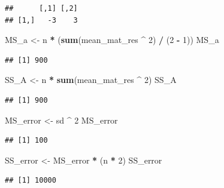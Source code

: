 \documentclass[]{book}
\newenvironment{Shaded}{\begin{snugshade}}{\end{snugshade}}
\newcommand{\DecValTok}[1]{\textcolor[rgb]{0.00,0.00,0.81}{#1}}
\newcommand{\KeywordTok}[1]{\textcolor[rgb]{0.13,0.29,0.53}{\textbf{#1}}}
\newcommand{\NormalTok}[1]{#1}
\newcommand{\OperatorTok}[1]{\textcolor[rgb]{0.81,0.36,0.00}{\textbf{#1}}}
\newcommand{\StringTok}[1]{\textcolor[rgb]{0.31,0.60,0.02}{#1}}
\begin{document}
\begin{verbatim}
##      [,1] [,2]
## [1,]   -3    3
\end{verbatim}

\begin{Shaded}
\begin{Highlighting}[]
\NormalTok{MS_a <-}\StringTok{ }\NormalTok{n }\OperatorTok{*}\StringTok{ }\NormalTok{(}\KeywordTok{sum}\NormalTok{(mean_mat_res }\OperatorTok{^}\StringTok{ }\DecValTok{2}\NormalTok{) }\OperatorTok{/}\StringTok{ }\NormalTok{(}\DecValTok{2} \OperatorTok{-}\StringTok{ }\DecValTok{1}\NormalTok{))}
\NormalTok{MS_a}
\end{Highlighting}
\end{Shaded}

\begin{verbatim}
## [1] 900
\end{verbatim}

\begin{Shaded}
\begin{Highlighting}[]
\NormalTok{SS_A <-}\StringTok{ }\NormalTok{n }\OperatorTok{*}\StringTok{ }\KeywordTok{sum}\NormalTok{(mean_mat_res }\OperatorTok{^}\StringTok{ }\DecValTok{2}\NormalTok{)}
\NormalTok{SS_A}
\end{Highlighting}
\end{Shaded}

\begin{verbatim}
## [1] 900
\end{verbatim}

\begin{Shaded}
\begin{Highlighting}[]
\NormalTok{MS_error <-}\StringTok{ }\NormalTok{sd }\OperatorTok{^}\StringTok{ }\DecValTok{2}
\NormalTok{MS_error}
\end{Highlighting}
\end{Shaded}

\begin{verbatim}
## [1] 100
\end{verbatim}

\begin{Shaded}
\begin{Highlighting}[]
\NormalTok{SS_error <-}\StringTok{ }\NormalTok{MS_error }\OperatorTok{*}\StringTok{ }\NormalTok{(n }\OperatorTok{*}\StringTok{ }\DecValTok{2}\NormalTok{)}
\NormalTok{SS_error}
\end{Highlighting}
\end{Shaded}

\begin{verbatim}
## [1] 10000
\end{verbatim}
\end{document}
